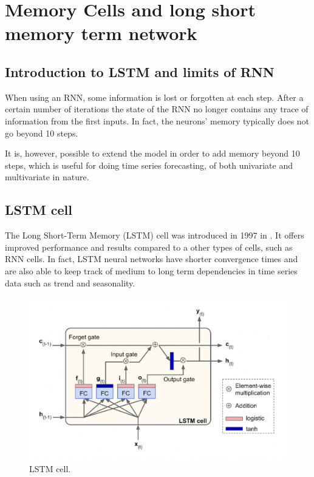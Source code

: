 \section{Memory Cells and long short memory term network}

\subsection{Introduction to LSTM and limits of RNN}
When using an RNN, some information is lost  or forgotten at each step. After a certain number of iterations the state of the RNN no longer contains any trace of information from the first inputs. In fact, the neurons' memory typically does not go beyond 10 steps.

It is, however, possible to extend the model in order to add memory beyond 10 steps, which is useful for doing time series forecasting, of both univariate and multivariate in nature.

\subsection{LSTM cell} \label{lstmcell}
The Long Short-Term Memory (LSTM) cell was introduced in 1997 in \citeauthor{LSTM} \autocite{LSTM}.
It offers improved performance and results compared to a other types of cells, such as RNN cells. In fact, LSTM neural networks have shorter convergence times and are also able to keep track of medium to long term dependencies in time series data such as trend and seasonality.

\begin{figure} [h]
    \centering
    \includegraphics[width=\textwidth,height=\textheight,keepaspectratio]{Images/Theory_and_method/unnamed-8.png}
    \caption{LSTM cell.}
    \label{fig:LSTM_cell}
\end{figure}

